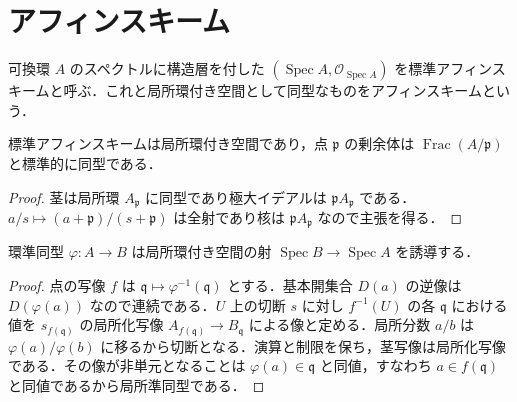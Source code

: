 \section{アフィンスキーム}
\begin{defn}[アフィンスキーム]
可換環 $A$ のスペクトルに構造層を付した $(\operatorname{Spec}A,\mathcal O_{\operatorname{Spec}A})$ を標準アフィンスキームと呼ぶ．これと局所環付き空間として同型なものをアフィンスキームという．
\end{defn}
\begin{prop}[標準アフィンスキームの局所環性]
標準アフィンスキームは局所環付き空間であり，点 $\mathfrak p$ の剰余体は $\operatorname{Frac}(A/\mathfrak p)$ と標準的に同型である．
\end{prop}
\begin{proof}
茎は局所環 $A_{\mathfrak p}$ に同型であり極大イデアルは $\mathfrak p A_{\mathfrak p}$ である．$a/s\mapsto(a+\mathfrak p)/(s+\mathfrak p)$ は全射であり核は $\mathfrak p A_{\mathfrak p}$ なので主張を得る．
\end{proof}
\begin{prop}[環準同型が誘導する射]
環準同型 $\varphi:A\to B$ は局所環付き空間の射 $\operatorname{Spec}B\to\operatorname{Spec}A$ を誘導する．
\end{prop}
\begin{proof}
点の写像 $f$ は $\mathfrak q\mapsto\varphi^{-1}(\mathfrak q)$ とする．基本開集合 $D(a)$ の逆像は $D(\varphi(a))$ なので連続である．$U$ 上の切断 $s$ に対し $f^{-1}(U)$ の各 $\mathfrak q$ における値を $s_{f(\mathfrak q)}$ の局所化写像 $A_{f(\mathfrak q)}\to B_{\mathfrak q}$ による像と定める．局所分数 $a/b$ は $\varphi(a)/\varphi(b)$ に移るから切断となる．演算と制限を保ち，茎写像は局所化写像である．その像が非単元となることは $\varphi(a)\in\mathfrak q$ と同値，すなわち $a\in f(\mathfrak q)$ と同値であるから局所準同型である．
\end{proof}
